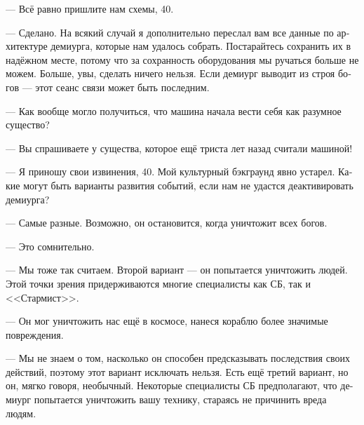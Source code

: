 \documentclass[a4paper,10pt,fleqn]{book}\usepackage{polyglossia}\setdefaultlanguage[babelshorthands=true]{russian}\setotherlanguage{english}\defaultfontfeatures{Ligatures=TeX,Mapping=tex-text}\usepackage{xcolor}\newcommand{\ml}[3]{#2}
\begin{document}
\ml{$0$}
{--- Всё равно пришлите нам схемы, 40.}
{``Send us the blueprints anyway, 40.''}

\ml{$0$}
{--- Сделано.}
{``It's done.}
\ml{$0$}
{На всякий случай я дополнительно переслал вам все данные по архитектуре демиурга, которые нам удалось собрать.}
{Just in case, I send you all the data on the demiurge architecture we could collect.}
Постарайтесь сохранить их в надёжном месте, потому что за сохранность оборудования мы ручаться больше не можем.
\ml{$0$}
{Больше, увы, сделать ничего нельзя.}
{And, I'm afraid, we've run out of options.}
Если демиург выводит из строя богов --- этот сеанс связи может быть последним.

\ml{$0$}
{--- Как вообще могло получиться, что машина начала вести себя как разумное существо?}
{``How is it possible that a machine started act like a sapient?''}

\ml{$0$}
{--- Вы спрашиваете у существа, которое ещё триста лет назад считали машиной!}
{``You're asking a specimen of sapients which were treated as machines just three hundred years ago!''}

--- Я приношу свои извинения, 40.
\ml{$0$}
{Мой культурный бэкграунд явно устарел.}
{My culture background is obviously outdated.}
Какие могут быть варианты развития событий, если нам не удастся деактивировать демиурга?

--- Самые разные.
Возможно, он остановится, когда уничтожит всех богов.

\ml{$0$}
{--- Это сомнительно.}
{``Hard to believe.''}

--- Мы тоже так считаем.
\ml{$0$}
{Второй вариант --- он попытается уничтожить людей.}
{The second option: it will try to wipe humans out.}
Этой точки зрения придерживаются многие специалисты как СБ, так и <<Стармист>>.

\ml{$0$}
{--- Он мог уничтожить нас ещё в космосе, нанеся кораблю более значимые повреждения.}
{``It could do it in space, causing more serious damage to the ship.''}

\ml{$0$}
{--- Мы не знаем о том, насколько он способен предсказывать последствия своих действий, поэтому этот вариант исключать нельзя.}
{``We know nothing about its ability to predict consequences of its actions, so that option cannot be excluded.}
\ml{$0$}
{Есть ещё третий вариант, но он, мягко говоря, необычный.}
{There is one more, but this option, to put it mildly, unusual.}
\ml{$0$}
{Некоторые специалисты СБ предполагают, что демиург попытается уничтожить вашу технику, стараясь не причинить вреда людям.}
{Some SSC specialists suggest that the demiurge will try to destroy your equipment and not to harm humans.''}
\end{document}
